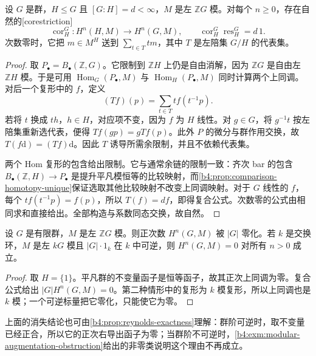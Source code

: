 \begin{proposition}\label{b4:prop:group-corestriction}
设 \(G\) 是群，\(H\le G\) 且 \([G:H]=d<\infty\)，\(M\) 是左 \(\mathbb ZG\) 模。对每个 \(n\ge0\)，存在自然的[corestriction]
\[
\operatorname{cor}_H^G:H^n(H,M)\longrightarrow H^n(G,M),
\qquad
\operatorname{cor}_H^G\operatorname{res}_H^G=d\,1.
\]
次数零时，它把 \(m\in M^H\) 送到 \(\sum_{t\in T}tm\)，其中 \(T\) 是左陪集 \(G/H\) 的代表集。
\end{proposition}
\begin{proof}
取 \(P_\bullet=B_\bullet(\mathbb Z,G)\)。它限制到 \(\mathbb ZH\) 上仍是自由消解，因为 \(\mathbb ZG\) 是自由左 \(\mathbb ZH\) 模。于是可用 \(\operatorname{Hom}_G(P_\bullet,M)\) 与 \(\operatorname{Hom}_H(P_\bullet,M)\) 同时计算两个上同调。对后一个复形中的 \(f\)，定义
\[
(Tf)(p)=\sum_{t\in T}t f(t^{-1}p).
\]
若将 \(t\) 换成 \(th\)，\(h\in H\)，对应项不变，因为 \(f\) 为 \(H\) 线性。对 \(g\in G\)，将 \(g^{-1}t\) 按左陪集重新选代表，便得 \(Tf(gp)=gTf(p)\)。此外 \(P\) 的微分与群作用交换，故 \(T(f\mathrm{d})=(Tf)\mathrm{d}\)。因此 \(T\) 诱导所需余限制，并且不依赖代表集。

两个 Hom 复形的包含给出限制。它与通常余链的限制一致：齐次 bar 的包含 \(B_\bullet(\mathbb Z,H)\to P_\bullet\) 是提升平凡模恒等的比较映射，而\cref{b4:prop:comparison-homotopy-unique}保证选取其他比较映射不改变上同调映射。对于 \(G\) 线性的 \(f\)，每个 \(t f(t^{-1}p)=f(p)\)，所以 \(T(f)=df\)，即得复合公式。次数零的公式由相同求和直接给出。全部构造与系数同态交换，故自然。
\end{proof}

\begin{corollary}\label{b4:cor:finite-group-torsion}
设 \(G\) 是有限群，\(M\) 是左 \(\mathbb ZG\) 模。则正次数 \(H^n(G,M)\) 被 \(|G|\) 零化。若 \(k\) 是交换环，\(M\) 是左 \(kG\) 模且 \(|G|\cdot1_k\) 在 \(k\) 中可逆，则 \(H^n(G,M)=0\) 对所有 \(n>0\) 成立。
\end{corollary}
\begin{proof}
取 \(H=\{1\}\)。平凡群的不变量函子是恒等函子，故其正次上同调为零。复合公式给出 \(|G|H^n(G,M)=0\)。第二种情形中的复形为 \(k\) 模复形，所以上同调也是 \(k\) 模；一个可逆标量把它零化，只能使它为零。
\end{proof}

上面的消失结论也可由\cref{b4:prop:reynolds-exactness}理解：群阶可逆时，取不变量已经正合，所以它的正次右导出函子为零；当群阶不可逆时，\cref{b4:exm:modular-augmentation-obstruction}给出的非零类说明这个理由不再成立。

